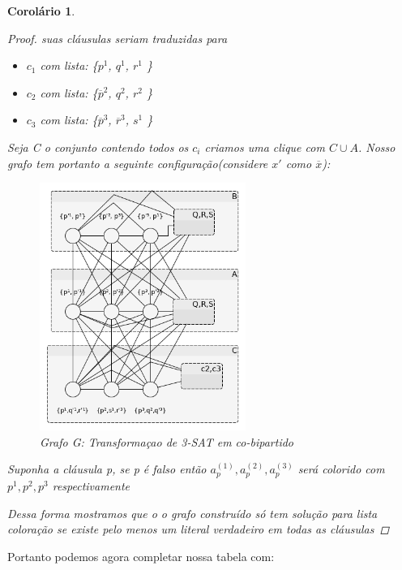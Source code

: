 \documentclass[a4paper,11pt]{article}
\newtheorem{corolario}{Corolário}
\begin{document}
\begin{corolario}
\begin{proof}
    suas cláusulas seriam traduzidas para
    \begin{itemize}
      \item $c_1$ com lista: \{$p^1$, $q^1$, $r^1$ \}
      \item $c_2$ com lista: \{$\overline{p}^2$, $q^2$, $r^2$ \}
      \item $c_3$ com lista: \{$\overline{p}^3$, $\overline{r}^3$, $s^1$ \}
    \end{itemize}
    Seja C o conjunto contendo todos os $c_i$ criamos uma clique com $C \cup A$.
    Nosso grafo tem portanto a seguinte configuração(considere $x'$ como $\overline{x}$):
    \begin{figure}[!ht]
        \centering
        \includegraphics[width=0.6\textwidth]{3-SAT.png}
        \caption{Grafo G: Transformaçao de 3-SAT em co-bipartido }
      \end{figure}
      
      Suponha a cláusula p, se p é falso então $a_p^{(1)},a_p^{(2)},a_p^{(3)}$ será colorido com $p^1,p^2,p^3$ respectivamente
      
    Dessa forma mostramos que o o grafo construído só tem solução para lista coloração se existe pelo menos um literal verdadeiro em todas as cláusulas
    \end{proof}
    \end{corolario}
    
Portanto podemos agora completar nossa tabela com:
\end{document}
